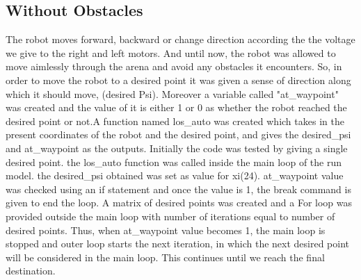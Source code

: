 \documentclass{l4proj}
\begin{document}
\subsection{Without Obstacles}

The robot moves forward, backward or change direction according the the voltage we give to the right and left motors. And until now, the robot was allowed to move aimlessly through the arena and avoid any obstacles it encounters. So, in order to move the robot to a desired point it was given a sense of direction along which it should move, (desired Psi). Moreover a variable called "at\_waypoint" was created and the value of it is either 1 or 0 as whether the robot reached the desired point or not.\newline A function named los\_auto was created which takes in the present coordinates of the robot and the desired point, and gives the desired\_psi and at\_waypoint as the outputs. 
\newline Initially the code was tested by giving a single desired point. the los\_auto function was called inside the main loop of the run model. the desired\_psi obtained was set as value for xi(24).  at\_waypoint value was checked using an if statement and once the value is 1, the break command is given to end the loop.
\newline A matrix of desired points was created and a For loop was provided outside the main loop with number of iterations equal to number of desired points. Thus, when at\_waypoint value becomes 1, the main loop is stopped and outer loop starts the next iteration, in which the next desired point will be considered in the main loop. This continues until we reach the final destination.
\end{document}
